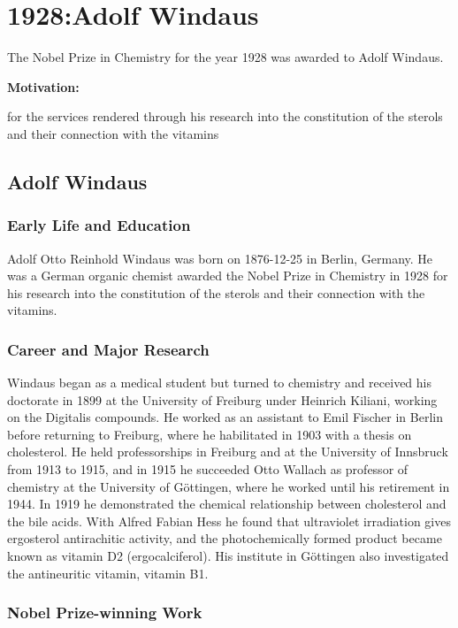 \chapter{1928:Adolf Windaus}

\label{chap:chemistry1928}

The Nobel Prize in Chemistry for the year 1928 was awarded to Adolf Windaus.

\textbf{Motivation:}

for the services rendered through his research into the constitution of the sterols and their connection with the vitamins

\section{Adolf Windaus}

\subsection*{Early Life and Education}

Adolf Otto Reinhold Windaus was born on 1876-12-25 in Berlin, Germany.
He was a German organic chemist awarded the Nobel Prize in Chemistry in 1928 for his research into the constitution of the sterols and their connection with the vitamins.

\subsection*{Career and Major Research}

Windaus began as a medical student but turned to chemistry and received his doctorate in 1899 at the University of Freiburg under Heinrich Kiliani, working on the Digitalis compounds.
He worked as an assistant to Emil Fischer in Berlin before returning to Freiburg, where he habilitated in 1903 with a thesis on cholesterol.
He held professorships in Freiburg and at the University of Innsbruck from 1913 to 1915, and in 1915 he succeeded Otto Wallach as professor of chemistry at the University of Göttingen, where he worked until his retirement in 1944.
In 1919 he demonstrated the chemical relationship between cholesterol and the bile acids.
With Alfred Fabian Hess he found that ultraviolet irradiation gives ergosterol antirachitic activity, and the photochemically formed product became known as vitamin D2 (ergocalciferol).
His institute in Göttingen also investigated the antineuritic vitamin, vitamin B1.

\subsection*{Nobel Prize-winning Work}

